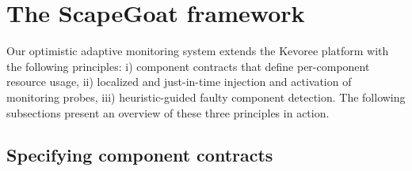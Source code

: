 \section{The ScapeGoat framework\label{sec:approach}}


Our optimistic adaptive monitoring system extends the Kevoree platform with the following principles: i) component contracts that define per-component resource usage, ii) localized and just-in-time injection and activation of monitoring probes, iii) heuristic-guided faulty component detection. The following subsections present an overview of these three principles in action. 
 



\subsection{Specifying component contracts} \label{componentcontract}

